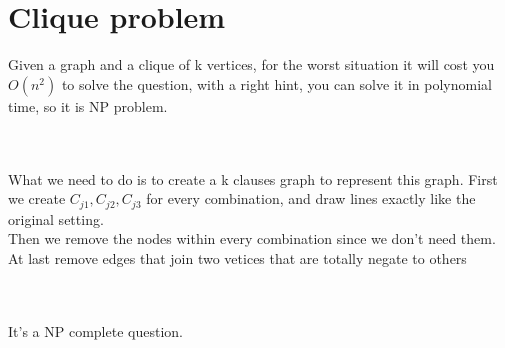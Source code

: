 \documentclass{article}
\begin{document}
\section{Clique problem}
Given a graph and a clique of k vertices, for the worst situation it will cost you $O(n^2)$ to solve the question, with a right hint, you can solve it in polynomial time, so it is NP problem.
\\\\
\\What we need to do is to create a k clauses graph to represent this graph. 
First we create $C_{j1}, C_{j2}, C_{j3}$ for every combination, and draw lines exactly like the original setting.
\\Then we remove the nodes within every combination since we don't need them.
\\ At last remove edges that join two vetices that are totally negate to others
\\\\
\\It's a NP complete question.
\clearpage
\end{document}
